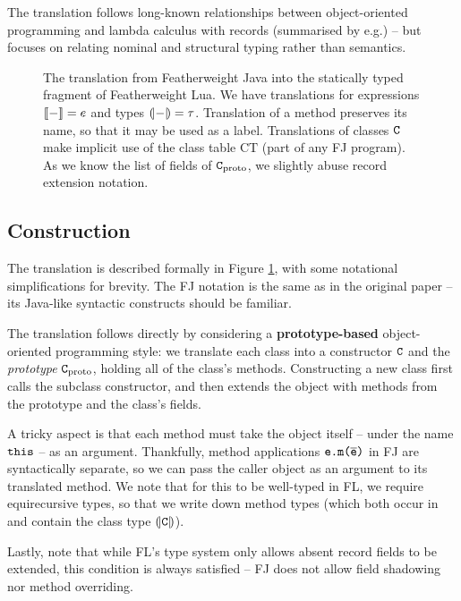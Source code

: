 The translation follows long-known relationships between object-oriented programming and lambda calculus with records (summarised by e.g.\@ \textcite{pierce-thesis}) -- but focuses on relating nominal and structural typing rather than semantics.


\begin{figure}
    \centering
    
    \caption{The translation from Featherweight Java into the statically typed fragment of Featherweight Lua. We have translations for expressions $\denot{-} = e$ and types $\denoty{-} = \tau$. Translation of a method preserves its name, so that it may be used as a label. Translations of classes $\texttt{C}$ make implicit use of the class table $\mathrm{CT}$ (part of any FJ program). As we know the list of fields of $\texttt{C}_\mathrm{proto}$, we slightly abuse record extension notation.}
    \label{fig:translation}
\end{figure}

\subsection{Construction}

The translation is described formally in Figure \ref{fig:translation}, with some notational simplifications for brevity. The FJ notation is the same as in the original paper \cite{featherweight-java} -- its Java-like syntactic constructs should be familiar.

The translation follows directly by considering a \textbf{prototype-based} object-oriented programming style: we translate each class into a constructor $\texttt{C}$ and the \emph{prototype} $\texttt{C}_\mathrm{proto}$, holding all of the class's methods. Constructing a new class first calls the subclass constructor, and then extends the object with methods from the prototype and the class's fields.

A tricky aspect is that each method must take the object itself -- under the name $\texttt{this}$ -- as an argument. Thankfully, method applications $\texttt{e.m($\overline{\mbox{e}}$)}$ in FJ are syntactically separate, so we can pass the caller object as an argument to its translated method. 
We note that for this to be well-typed in FL, we require equirecursive types, so that we write down method types (which both occur in and contain the class type $\denoty{\fj C}$).

Lastly, note that while FL's type system only allows absent record fields to be extended, this condition is always satisfied -- FJ does not allow field shadowing nor method overriding.

